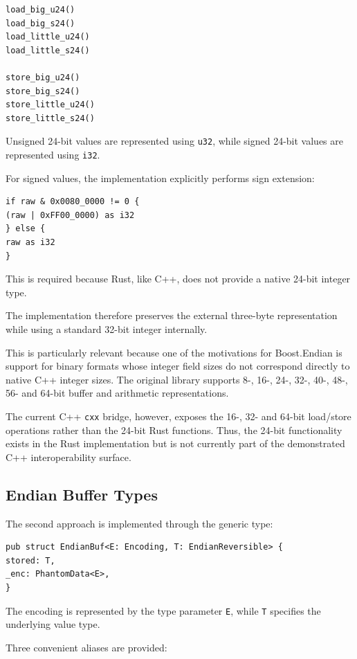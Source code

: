 \begin{lstlisting}[style=rustblock]
load_big_u24()
load_big_s24()
load_little_u24()
load_little_s24()

store_big_u24()
store_big_s24()
store_little_u24()
store_little_s24()
\end{lstlisting}

Unsigned 24-bit values are represented using \texttt{u32}, while signed 24-bit values are represented using \texttt{i32}.

For signed values, the implementation explicitly performs sign extension:

\begin{lstlisting}[style=rustblock]
if raw & 0x0080_0000 != 0 {
(raw | 0xFF00_0000) as i32
} else {
raw as i32
}
\end{lstlisting}

This is required because Rust, like C++, does not provide a native 24-bit integer type.

The implementation therefore preserves the external three-byte representation while using a standard 32-bit integer 
internally.

This is particularly relevant because one of the motivations for Boost.Endian is support for binary formats whose 
integer field sizes do not correspond directly to native C++ integer sizes. 
The original library supports 8-, 16-, 24-, 32-, 40-, 48-, 56- and 64-bit buffer and arithmetic representations.

The current C++ \texttt{cxx} bridge, however, exposes the 16-, 32- and 64-bit load/store operations rather than 
the 24-bit Rust functions. Thus, the 24-bit functionality exists in the Rust implementation but is not currently 
part of the demonstrated C++ interoperability surface.

\subsection{Endian Buffer Types}
The second approach is implemented through the generic type:

\begin{lstlisting}[style=rustblock]
pub struct EndianBuf<E: Encoding, T: EndianReversible> {
stored: T,
_enc: PhantomData<E>,
}
\end{lstlisting}

The encoding is represented by the type parameter \texttt{E}, while \texttt{T} specifies the underlying value type.

Three convenient aliases are provided:

